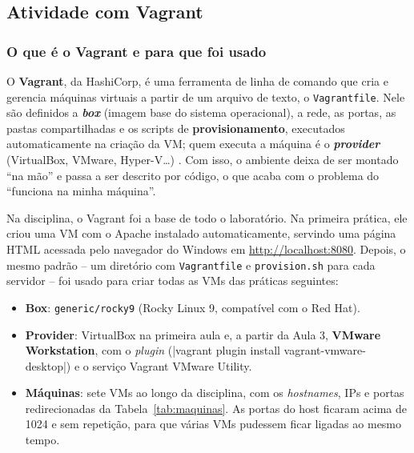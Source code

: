 \subsection{Atividade com Vagrant}\label{sec:vagrant}

\subsubsection{O que é o Vagrant e para que foi usado}

O \textbf{Vagrant}, da HashiCorp, é uma ferramenta de linha de comando que cria e gerencia máquinas
virtuais a partir de um arquivo de texto, o \texttt{Vagrantfile}. Nele são definidos a
\textbf{\textit{box}} (imagem base do sistema operacional), a rede, as portas, as pastas compartilhadas
e os scripts de \textbf{provisionamento}, executados automaticamente na criação da VM; quem executa a
máquina é o \textbf{\textit{provider}} (VirtualBox, VMware, Hyper-V\ldots) \citep{hashicorp2026}.
Com isso, o ambiente deixa de ser montado ``na mão'' e passa a ser descrito por código, o que acaba
com o problema do ``funciona na minha máquina''.

Na disciplina, o Vagrant foi a base de todo o laboratório. Na primeira prática, ele criou uma VM com o
Apache instalado automaticamente, servindo uma página HTML acessada pelo navegador do Windows em
\url{http://localhost:8080}. Depois, o mesmo padrão -- um diretório com \texttt{Vagrantfile} e
\texttt{provision.sh} para cada servidor -- foi usado para criar todas as VMs das práticas seguintes:

\begin{itemize}
  \item \textbf{Box}: \texttt{generic/rocky9} (Rocky Linux 9, compatível com o Red Hat).
  \item \textbf{Provider}: VirtualBox na primeira aula e, a partir da Aula 3, \textbf{VMware
        Workstation}, com o \textit{plugin} 
        (\cod|vagrant plugin install vagrant-vmware-desktop|) e o serviço Vagrant VMware Utility.
  \item \textbf{Máquinas}: sete VMs ao longo da disciplina, com os \textit{hostnames}, IPs e portas
        redirecionadas da Tabela~\ref{tab:maquinas}. As portas do host ficaram acima de 1024 e sem
        repetição, para que várias VMs pudessem ficar ligadas ao mesmo tempo.
\end{itemize}


